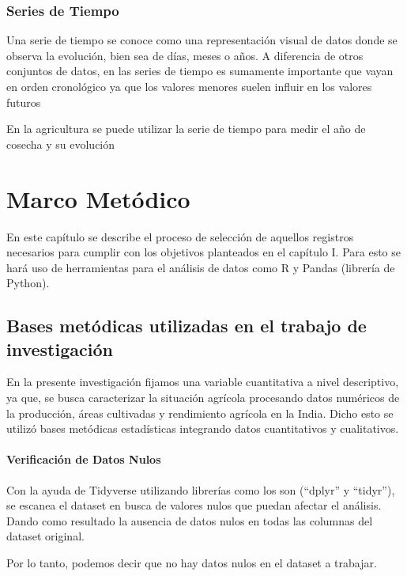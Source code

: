 \documentclass[oneside,11pt]{Latex/Classes/PhDthesisPSnPDF}
\begin{document}
\hfill\break

\subsection{Series de Tiempo}

Una serie de tiempo se conoce como una representación visual de datos
donde se observa la evolución, bien sea de días, meses o años. A
diferencia de otros conjuntos de datos, en las series de tiempo es
sumamente importante que vayan en orden cronológico ya que los valores
menores suelen influir en los valores futuros

En la agricultura se puede utilizar la serie de tiempo para medir el año
de cosecha y su evolución

\chapter{Marco Metódico}

En este capítulo se describe el proceso de selección de aquellos
registros necesarios para cumplir con los objetivos planteados en el
capítulo I. Para esto se hará uso de herramientas para el análisis de
datos como R y Pandas (librería de Python).\\

\section{Bases metódicas utilizadas en el trabajo de investigación}

En la presente investigación fijamos una variable cuantitativa a nivel
descriptivo, ya que, se busca caracterizar la situación agrícola
procesando datos numéricos de la producción, áreas cultivadas y
rendimiento agrícola en la India. Dicho esto se utilizó bases metódicas
estadísticas integrando datos cuantitativos y cualitativos.\\

\subsubsection{Verificación de Datos Nulos}

Con la ayuda de Tidyverse utilizando librerías como los son (``dplyr'' y
``tidyr''), se escanea el dataset en busca de valores nulos que puedan
afectar el análisis. Dando como resultado la ausencia de datos nulos en
todas las columnas del dataset original.

Por lo tanto, podemos decir que no hay datos nulos en el dataset a
trabajar.
\end{document}
